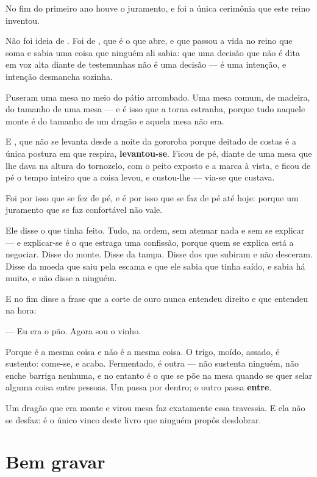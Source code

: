 \documentclass[livro.tex]{subfiles}
\begin{document}
No fim do primeiro ano houve o juramento, e foi a única cerimônia que este reino inventou.

Não foi ideia de \Qui . Foi de \Ben , que é o que abre, e que passou a vida no reino que soma e
sabia uma coisa que ninguém ali sabia: que uma decisão que não é dita em voz alta diante de
testemunhas não é uma decisão --- é uma intenção, e intenção desmancha sozinha.

\medskip

Puseram uma mesa no meio do pátio arrombado. Uma mesa comum, de madeira, do tamanho de uma mesa
--- e é isso que a torna estranha, porque tudo naquele monte é do tamanho de um dragão e aquela
mesa não era.

E \Ven , que não se levanta desde a noite da gororoba porque deitado de costas é a única postura
em que respira, \textbf{levantou-se}. Ficou de pé, diante de uma mesa que lhe dava na altura do
tornozelo, com o peito exposto e a marca à vista, e ficou de pé o tempo inteiro que a coisa
levou, e custou-lhe --- via-se que custava.

Foi por isso que se fez de pé, e é por isso que se faz de pé até hoje: porque um juramento que se
faz confortável não vale.

\medskip

Ele disse o que tinha feito. Tudo, na ordem, sem atenuar nada e sem se explicar --- e explicar-se
é o que estraga uma confissão, porque quem se explica está a negociar. Disse do monte. Disse da
tampa. Disse dos que subiram e não desceram. Disse da moeda que saiu pela escama e que ele sabia
que tinha saído, e sabia há muito, e não disse a ninguém.

E no fim disse a frase que a corte de ouro nunca entendeu direito e que \Qui entendeu na hora:

--- Eu era o pão. Agora sou o vinho.

Porque é a mesma coisa e não é a mesma coisa. O trigo, moído, assado, é sustento: come-se, e
acaba. Fermentado, é outra --- não sustenta ninguém, não enche barriga nenhuma, e no entanto é o
que se põe na mesa quando se quer selar alguma coisa entre pessoas. Um passa por dentro; o outro
passa \textbf{entre}.

Um dragão que era monte e virou mesa faz exatamente essa travessia. E ela não se desfaz: é o
único vinco deste livro que ninguém propôs desdobrar.

\section{Bem gravar}
\end{document}
